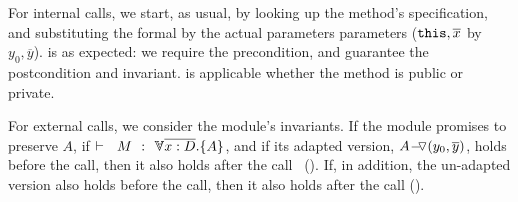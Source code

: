 For  internal calls, we  start, as usual,  by looking up the method's specification, and 
{substituting the formal  by the actual parameters parameters ($\prg{this}, \overline{x}$  by $y_0,\overline{y}$).} %
  {} is as expected:   we  require the precondition, and guarantee the postcondition and invariant.
 {} %
 {is} applicable whether the method is public or private.


For external calls, %
we consider the module's invariants. 
If the module promises to preserve $A$, \ie if  $\promises M   {\TwoStatesN {\overline {x:D}} {A}}$, {and  if its adapted version, $ \PushASLong {(y_0, \overline y)}{A}$},  holds before the call, then it also holds after  the call \ ({}).
{If, in addition, the un-adapted version also holds before the call, then it also holds after the call  ({}).}



\vspace{.1cm}

